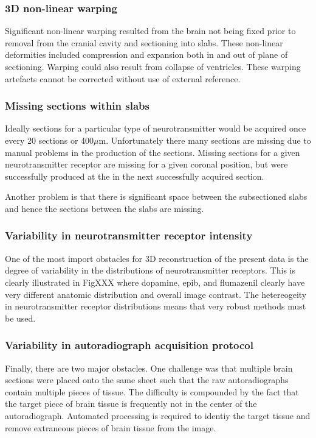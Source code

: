\documentclass[12pt]{article}
\begin{document}
\subsubsection{3D non-linear warping}

Significant non-linear warping resulted from the brain not being fixed prior to removal from the cranial cavity and sectioning into slabs. These non-linear deformities included compression and expansion both in and out of plane of sectioning. Warping could also result from collapse of ventricles. These warping artefacts cannot be corrected without use of external reference. 

\subsubsection{Missing sections within slabs}

Ideally sections for a particular type of neurotransmitter would be acquired once every 20 sections or 400$\mu$m. Unfortunately there many sections are missing due to manual problems in the production of the sections. Missing sections for a given neurotransmitter receptor are missing for a given coronal position, but were successfully produced at the in the next successfully acquired section.

Another problem is that there is significant space between the subsectioned slabs and hence the sections between the slabs are missing.

\subsubsection{Variability in neurotransmitter receptor intensity}

One of the most import obstacles for 3D reconstruction of the present data is the degree of variability in the distributions of neurotransmitter receptors. This is clearly illustrated in FigXXX where dopamine, epib, and flumazenil clearly have very different anatomic distribution and overall image contrast. The hetereogeity in neurotransmitter receptor distributions means that very robust methods must be used.

\subsubsection{Variability in autoradiograph acquisition protocol }

Finally, there are two major obstacles. One challenge was that multiple brain sections were placed onto the same sheet such that the raw autoradiographs contain multiple pieces of tissue. The difficulty is compounded by the fact that the target piece of brain tissue is frequently not in the center of the autoradiograph. Automated processing is required to identiy the target tissue and remove extraneous pieces of brain tissue from the image. 
\end{document}
